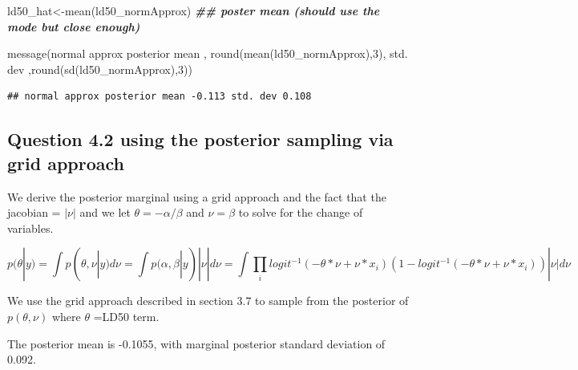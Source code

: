 \documentclass[
]{book}
\newenvironment{Shaded}{\begin{snugshade}}{\end{snugshade}}
\newcommand{\DecValTok}[1]{\textcolor[rgb]{0.00,0.00,0.81}{#1}}
\newcommand{\DocumentationTok}[1]{\textcolor[rgb]{0.56,0.35,0.01}{\textbf{\textit{#1}}}}
\newcommand{\FunctionTok}[1]{\textcolor[rgb]{0.00,0.00,0.00}{#1}}
\newcommand{\NormalTok}[1]{#1}
\newcommand{\OtherTok}[1]{\textcolor[rgb]{0.56,0.35,0.01}{#1}}
\newcommand{\StringTok}[1]{\textcolor[rgb]{0.31,0.60,0.02}{#1}}
\theoremstyle{definition}
\theoremstyle{definition}
\theoremstyle{definition}
\theoremstyle{definition}
\theoremstyle{remark}
\begin{document}
\begin{Shaded}
\begin{Highlighting}[]
\NormalTok{ ld50\_hat}\OtherTok{\textless{}{-}}\FunctionTok{mean}\NormalTok{(ld50\_normApprox)  }\DocumentationTok{\#\# poster mean (should use the mode but close enough)}
 
 \FunctionTok{message}\NormalTok{(}\StringTok{\textquotesingle{}normal approx posterior mean \textquotesingle{}}\NormalTok{, }\FunctionTok{round}\NormalTok{(}\FunctionTok{mean}\NormalTok{(ld50\_normApprox),}\DecValTok{3}\NormalTok{),}\StringTok{\textquotesingle{} std. dev \textquotesingle{}}\NormalTok{,}\FunctionTok{round}\NormalTok{(}\FunctionTok{sd}\NormalTok{(ld50\_normApprox),}\DecValTok{3}\NormalTok{))}
\end{Highlighting}
\end{Shaded}

\begin{verbatim}
## normal approx posterior mean -0.113 std. dev 0.108
\end{verbatim}

\hypertarget{question-4.2-using-the-posterior-sampling-via-grid-approach}{%
\subsection{Question 4.2 using the posterior sampling via grid approach}\label{question-4.2-using-the-posterior-sampling-via-grid-approach}}

We derive the posterior marginal using a grid approach and the fact that the jacobian = \(|\nu|\) and we let \(\theta= -\alpha/\beta\) and \(\nu=\beta\) to solve for the change of variables.

\[
p(\theta|y) = \int p(\theta,\nu|y)d\nu = \int p(\alpha,\beta|y)|\nu|d\nu 
=\int \prod_i logit^{-1}(-\theta*\nu+\nu*x_i)(1-logit^{-1}(-\theta*\nu+\nu*x_i))|\nu|d\nu
\]

We use the grid approach described in section 3.7 to sample from the posterior of \(p(\theta,\nu)\) where \(\theta\) =LD50 term.

The posterior mean is -0.1055, with marginal posterior standard deviation of 0.092.
\end{document}
